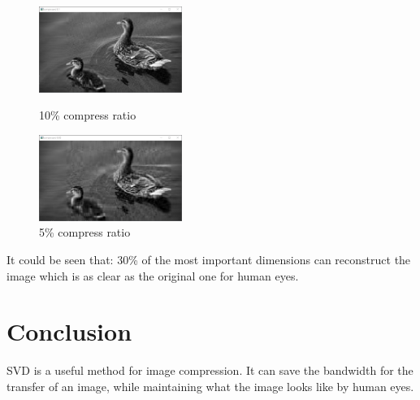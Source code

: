 \documentclass{article}
\begin{document}
            \begin{figure}[htbp]
                \centering
                \begin{minipage}[t]{0.45\linewidth}
                    \centering
                    \includegraphics[height=2.8cm]{imgs/compressed-0.1.png}
                    \caption{10\% compress ratio}
                \end{minipage}
                \hfill
                \begin{minipage}[t]{0.45\linewidth}
                    \centering
                    \includegraphics[height=2.8cm]{imgs/compressed-0.05.png}
                    \caption{5\% compress ratio}
                \end{minipage}
            \end{figure}

            \par
            It could be seen that: 30\% of the most important dimensions can reconstruct
            the image which is as clear as the original one for human eyes.


    \section{Conclusion}
        \par
        SVD is a useful method for image compression.
        It can save the bandwidth for the transfer of an image,
        while maintaining what the image looks like by human eyes.
\end{document}
